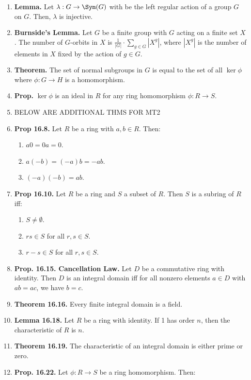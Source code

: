 \begin{enumerate}
	\item \textbf{Lemma. } Let $\lambda: G \to \Sym(G)$ with be the left regular action of a group $G$ on $G$. Then, $\lambda$ is injective. 
	\item \textbf{Burnside's Lemma. } Let $G$ be a finite group with $G$ acting on a finite set $X$. The number of $G$-orbits in $X$ is $\frac{1}{|G|} \cdot \sum_{g \in G} |X^g|$, where $|X^g|$ is the number of elements in $X$ fixed by the action of $g \in G$. 
	\item \textbf{Theorem. } The set of normal subgroups in $G$ is equal to the set of all $\ker \phi$ where $\phi: G \to H$ is a homomorphism. 
	\item \textbf{Prop. } $\ker\phi$ is an ideal in $R$ for any ring homomorphism $\phi: R \to S$. 
	\item BELOW ARE ADDITIONAL THMS FOR MT2
	\item \textbf{Prop 16.8. } Let $R$ be a ring with $a,b \in R$. Then: 
	\begin{enumerate}
		\item $a0=0a=0$. 
		\item $a(-b)=(-a)b=-ab$. 
		\item $(-a)(-b) = ab$. 
	\end{enumerate}
	\item \textbf{Prop 16.10. } Let $R$ be a ring and $S$ a subset of $R$. Then $S$ is a subring of $R$ iff: 
	\begin{enumerate}
		\item $S \neq \emptyset$. 
		\item $rs \in S$ for all $r,s \in S$. 
		\item $r-s \in S$ for all $r,s \in S$. 
	\end{enumerate}
	\item \textbf{Prop. 16.15. Cancellation Law. } Let $D$ be a commutative ring with identity. Then $D$ is an integral domain iff for all nonzero elements $a \in D$ with $ab=ac$, we have $b=c$. 
        \item \textbf{Theorem 16.16. } Every finite integral domain is a field. 
        \item \textbf{Lemma 16.18. } Let $R$ be a ring with identity. If 1 has order $n$, then the characteristic of $R$ is $n$. 
        \item \textbf{Theorem 16.19. } The characteristic of an integral domain is either prime or zero. 
	\item \textbf{Prop. 16.22. } Let $\phi:R \to S$ be a ring homomorphism. Then: 
        \begin{enumerate}

\end{enumerate}
\end{enumerate}
